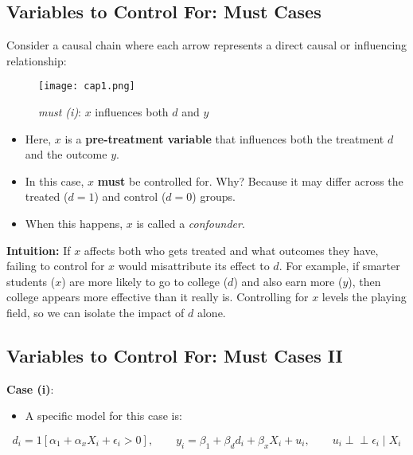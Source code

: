\documentclass[12pt]{article}
\begin{document}
\subsection*{\noindent\textbf{Variables to Control For: Must Cases}}

Consider a causal chain where each arrow represents a direct causal or influencing relationship:

\begin{figure}[H]
  \centering
  \texttt{[image: cap1.png]} %
  \caption*{\textit{must (i)}: $x$ influences both $d$ and $y$}
\end{figure}

\begin{itemize}
  \item Here, $x$ is a \textbf{pre-treatment variable} that influences both the treatment $d$ and the outcome $y$.
  \item In this case, $x$ \textbf{must} be controlled for. Why? Because it may differ across the treated ($d = 1$) and control ($d = 0$) groups.
  \item When this happens, $x$ is called a \textit{confounder}.
\end{itemize}

\textbf{Intuition:}  
If $x$ affects both who gets treated and what outcomes they have, failing to control for $x$ would misattribute its effect to $d$. For example, if smarter students ($x$) are more likely to go to college ($d$) and also earn more ($y$), then college appears more effective than it really is. Controlling for $x$ levels the playing field, so we can isolate the impact of $d$ alone.

\subsection*{\noindent\textbf{Variables to Control For: Must Cases II}}

\textbf{Case (i)}: 

\begin{itemize}
  \item A specific model for this case is:
\end{itemize}

\begin{equation}
d_i = 1[\alpha_1 + \alpha_x X_i + \epsilon_i > 0], \qquad 
y_i = \beta_1 + \beta_d d_i + \beta_x X_i + u_i, \qquad 
u_i \perp\!\!\!\perp \epsilon_i \mid X_i
\end{equation}
\end{document}
